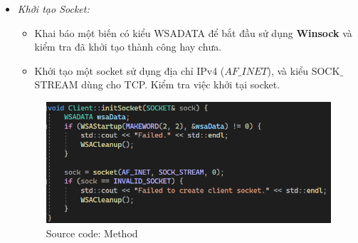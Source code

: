 \begin{itemize}
    \item \textit{Khởi tạo Socket:} 
    \begin{itemize}
        \item Khai báo một biến có kiểu WSADATA để bắt đầu sử dụng \textbf{Winsock} và kiểm tra đã khởi tạo thành công hay chưa.
        \item Khởi tạo một socket sử dụng địa chỉ IPv4 ($AF\_INET$), và kiểu SOCK$\_$STREAM dùng cho TCP. Kiểm tra việc khởi tại socket.
    \end{itemize}
    \begin{figure}[H]
	\begin{center}
		\includegraphics[scale=1]{img/initSocket}
        \caption{Source code: Method \textbf{}}
	\end{center}
		
    \end{figure}
    

\end{itemize}
